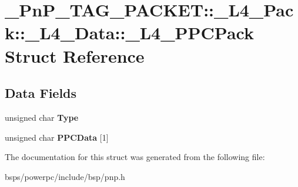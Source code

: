 \hypertarget{struct__PnP__TAG__PACKET_1_1__L4__Pack_1_1__L4__Data_1_1__L4__PPCPack}{}\section{\+\_\+\+Pn\+P\+\_\+\+T\+A\+G\+\_\+\+P\+A\+C\+K\+ET\+::\+\_\+\+L4\+\_\+\+Pack\+::\+\_\+\+L4\+\_\+\+Data\+::\+\_\+\+L4\+\_\+\+P\+P\+C\+Pack Struct Reference}
\label{struct__PnP__TAG__PACKET_1_1__L4__Pack_1_1__L4__Data_1_1__L4__PPCPack}
\subsection*{Data Fields}
\begin{DoxyCompactItemize}
\item 
\mbox{\label{struct__PnP__TAG__PACKET_1_1__L4__Pack_1_1__L4__Data_1_1__L4__PPCPack_a3d1994cfacfbc6070f71f6e5e69f66cb}} 
unsigned char {\bfseries Type}
\item 
\mbox{\label{struct__PnP__TAG__PACKET_1_1__L4__Pack_1_1__L4__Data_1_1__L4__PPCPack_a5d06b570a34e3700f7a220f0853fa879}} 
unsigned char {\bfseries P\+P\+C\+Data} \mbox{[}1\mbox{]}
\end{DoxyCompactItemize}


The documentation for this struct was generated from the following file\+:\begin{DoxyCompactItemize}
\item 
bsps/powerpc/include/bsp/pnp.\+h\end{DoxyCompactItemize}
